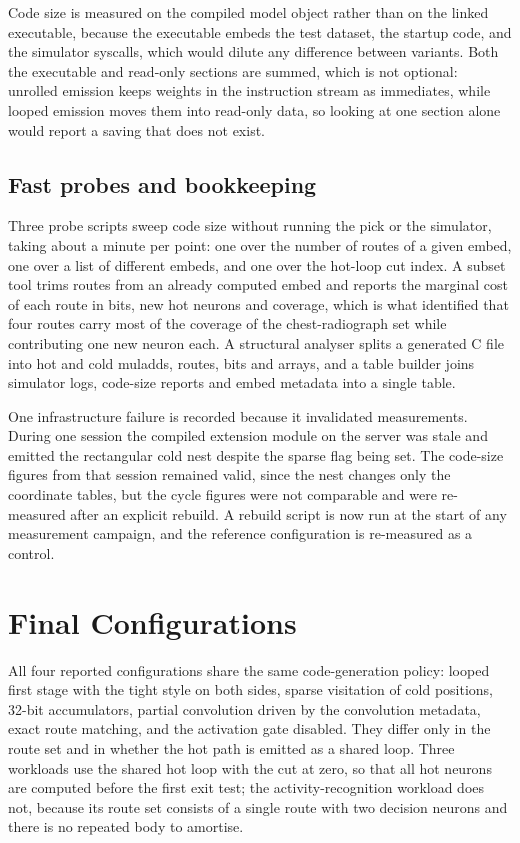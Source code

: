 Code size is measured on the compiled model object rather than on the linked executable, because the executable embeds the test dataset, the startup code, and the simulator syscalls, which would dilute any difference between variants.
Both the executable and read-only sections are summed, which is not optional: unrolled emission keeps weights in the instruction stream as immediates, while looped emission moves them into read-only data, so looking at one section alone would report a saving that does not exist.

\subsection{Fast probes and bookkeeping}

Three probe scripts sweep code size without running the pick or the simulator, taking about a minute per point: one over the number of routes of a given embed, one over a list of different embeds, and one over the hot-loop cut index.
A subset tool trims routes from an already computed embed and reports the marginal cost of each route in bits, new hot neurons and coverage, which is what identified that four routes carry most of the coverage of the chest-radiograph set while contributing one new neuron each.
A structural analyser splits a generated C file into hot and cold muladds, routes, bits and arrays, and a table builder joins simulator logs, code-size reports and embed metadata into a single table.

One infrastructure failure is recorded because it invalidated measurements.
During one session the compiled extension module on the server was stale and emitted the rectangular cold nest despite the sparse flag being set.
The code-size figures from that session remained valid, since the nest changes only the coordinate tables, but the cycle figures were not comparable and were re-measured after an explicit rebuild.
A rebuild script is now run at the start of any measurement campaign, and the reference configuration is re-measured as a control.


\section{Final Configurations}
\label{sec:impl-final}

All four reported configurations share the same code-generation policy: looped first stage with the tight style on both sides, sparse visitation of cold positions, 32-bit accumulators, partial convolution driven by the convolution metadata, exact route matching, and the activation gate disabled.
They differ only in the route set and in whether the hot path is emitted as a shared loop.
Three workloads use the shared hot loop with the cut at zero, so that all hot neurons are computed before the first exit test; the activity-recognition workload does not, because its route set consists of a single route with two decision neurons and there is no repeated body to amortise.

